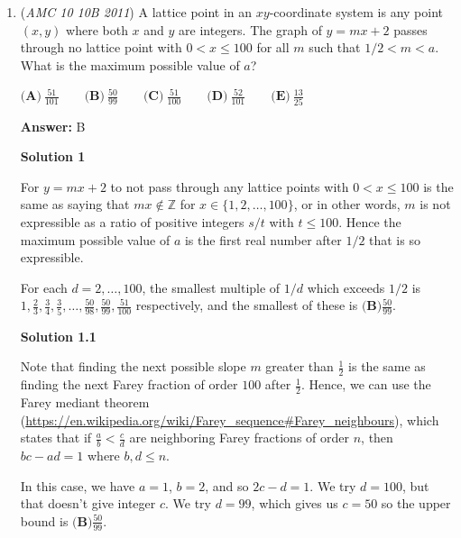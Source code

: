 \begin{enumerate}
 Now this is easier.

 $51^2 * 11 \equiv 601 * 11 \equiv 611 \pmod{1000}$

 This means that the answer is $\boxed{6}$

 Note: the problem where this is linked is covered 1:25-2:35

 


	\item (\textit{AMC 10 10B 2011}) A lattice point in an $xy$-coordinate system is any point $(x, y)$ where both $x$ and $y$ are integers. The graph of $y = mx +2$ passes through no lattice point with $0 < x \le 100$ for all $m$ such that $1/2 < m < a$. What is the maximum possible value of $a$?


 $\textbf{(A)}\ \frac{51}{101} \qquad\textbf{(B)}\ \frac{50}{99} \qquad\textbf{(C)}\ \frac{51}{100} \qquad\textbf{(D)}\ \frac{52}{101} \qquad\textbf{(E)}\ \frac{13}{25}$

 \textbf{Answer: }B



\textbf{Solution 1}

For $y=mx+2$ to not pass through any lattice points with $0<x\leq 100$ is the same as saying that $mx\notin\mathbb Z$ for $x\in\{1,2,\dots,100\}$, or in other words, $m$ is not expressible as a ratio of positive integers $s/t$ with $t\leq 100$. Hence the maximum possible value of $a$ is the first real number after $1/2$ that is so expressible.

 For each $d=2,\dots,100$, the smallest multiple of $1/d$ which exceeds $1/2$ is $1,\frac23,\frac34,\frac35,\dots,\frac{50}{98},\frac{50}{99},\frac{51}{100}$ respectively, and the smallest of these is $\boxed{\textbf{(B)}\frac{50}{99}}$.

 



\textbf{Solution 1.1}

Note that finding the next possible slope $m$ greater than $\frac{1}{2}$ is the same as finding the next Farey fraction of order $100$ after $\frac{1}{2}$. Hence, we can use the Farey mediant theorem (\href{https://en.wikipedia.org/wiki/Farey\_sequence\#Farey\_neighbours}{https://en.wikipedia.org/wiki/Farey\_sequence\#Farey\_neighbours}), which states that if $\frac{a}{b}<\frac{c}{d}$ are neighboring Farey fractions of order $n$, then $bc-ad=1$ where $b, d \leq n$.

 In this case, we have $a=1$, $b=2$, and so $2c-d=1$. We try $d=100$, but that doesn't give integer $c$. We try $d=99$, which gives us $c=50$ so the upper bound is $\boxed{\textbf{(B)}\frac{50}{99}}$.


\end{enumerate}
